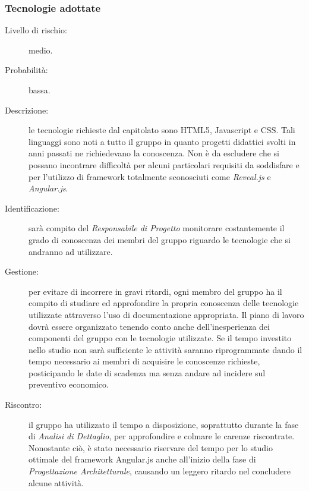 \subsubsection{Tecnologie adottate}
\begin{description}
	\item[Livello di rischio:] medio.
	\item[Probabilità:] bassa.
	\item[Descrizione:] le tecnologie richieste dal capitolato sono \gls{HTML5}, \gls{Javascript} e \gls{CSS}. Tali linguaggi sono noti a tutto il gruppo in quanto progetti didattici svolti in anni passati ne richiedevano la conoscenza. Non è da escludere che si possano incontrare difficoltà per alcuni particolari requisiti da soddisfare e per l'utilizzo di \gls{framework} totalmente sconosciuti come \textit{\gls{Reveal.js}} e \textit{\gls{Angular.js}}.
	\item[Identificazione:] sarà compito del \textit{Responsabile di Progetto} monitorare costantemente il grado di conoscenza dei membri del gruppo riguardo le tecnologie che si andranno ad utilizzare.
	\item[Gestione:] per evitare di incorrere in gravi ritardi, ogni membro del gruppo ha il compito di studiare ed approfondire la propria conoscenza delle tecnologie utilizzate attraverso l'uso di documentazione appropriata. Il piano di lavoro dovrà essere organizzato tenendo conto anche dell'inesperienza dei componenti del gruppo con le tecnologie utilizzate. Se il tempo investito nello studio non sarà sufficiente le attività saranno riprogrammate dando il tempo necessario ai membri di acquisire le conoscenze richieste, posticipando le date di scadenza ma senza andare ad incidere sul preventivo economico.
	\item[Riscontro:] il gruppo ha utilizzato il tempo a disposizione, soprattutto durante la fase di \textit{Analisi di Dettaglio}, per approfondire e colmare le carenze riscontrate. Nonostante ciò, è stato necessario riservare del tempo per lo studio ottimale del \gls{framework} \gls{Angular.js} anche all'inizio della fase di \textit{Progettazione Architetturale}, causando un leggero ritardo nel concludere alcune attività.
\end{description}
